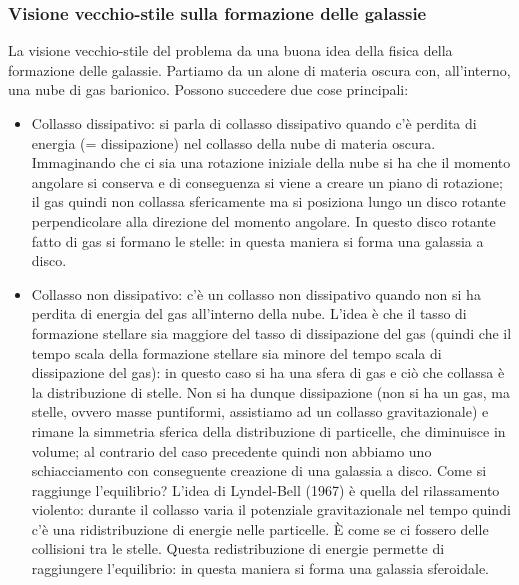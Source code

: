 \subsubsection{Visione vecchio-stile sulla formazione delle galassie}
La visione vecchio-stile del problema da una buona idea della fisica della formazione delle galassie. Partiamo da un alone di materia oscura con, all’interno, una nube di gas barionico. Possono succedere due cose principali:
\begin{itemize}
    \item  Collasso dissipativo: si parla di collasso dissipativo quando c’è perdita di energia (= dissipazione) nel collasso della nube di materia oscura. Immaginando che ci sia una rotazione iniziale della nube si ha che il momento angolare si conserva e di conseguenza si viene a creare un piano di rotazione; il gas quindi non collassa sfericamente ma si posiziona lungo un disco rotante perpendicolare alla direzione del momento angolare. In questo disco rotante fatto di gas si formano le stelle: in questa maniera si forma una galassia a disco.
    \item Collasso non dissipativo: c’è un collasso non dissipativo quando non si ha perdita di energia del gas all'interno della nube. L’idea è che il tasso di formazione stellare sia maggiore del tasso di dissipazione del gas (quindi che il tempo scala della formazione stellare sia minore del tempo scala di dissipazione del gas): in questo caso si ha una sfera di gas e ciò che collassa è la distribuzione di stelle. Non si ha dunque dissipazione (non si ha un gas, ma stelle, ovvero masse puntiformi,  assistiamo ad un collasso gravitazionale) e rimane la simmetria sferica della distribuzione di particelle, che diminuisce in volume; al contrario del caso precedente quindi non abbiamo uno schiacciamento con conseguente creazione di una galassia a disco. Come si raggiunge l’equilibrio? L’idea di Lyndel-Bell (1967) è quella del rilassamento  violento: durante il collasso varia il potenziale gravitazionale nel tempo quindi c’è una ridistribuzione di energie nelle particelle. È come se ci fossero delle collisioni tra le stelle. Questa redistribuzione di energie permette di raggiungere l’equilibrio: in questa maniera si forma una galassia sferoidale.
\end{itemize}

